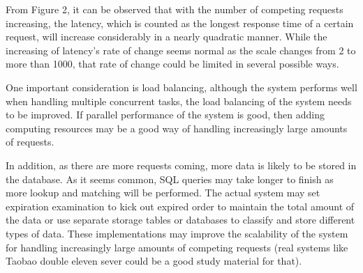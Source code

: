 \documentclass{article}
\begin{document}
From Figure 2, it can be observed that with the number of competing requests increasing, the latency, which is counted as the longest response time of a certain request, will increase considerably in a nearly quadratic manner. While the increasing of latency’s rate of change seems normal as the scale changes from 2 to more than 1000, that rate of change could be limited in several possible ways.\vspace{\baselineskip}

One important consideration is load balancing, although the system performs well when handling multiple concurrent tasks, the load balancing of the system needs to be improved. If parallel performance of the system is good, then adding computing resources may be a good way of handling increasingly large amounts of requests.\vspace{\baselineskip}

In addition, as there are more requests coming, more data is likely to be stored in the database. As it seems common, SQL queries may take longer to finish as more lookup and matching will be performed. The actual system may set expiration examination to kick out expired order to maintain the total amount of the data or use separate storage tables or databases to classify and store different types of data. These implementations may improve the scalability of the system for handling increasingly large amounts of competing requests (real systems like Taobao double eleven sever could be a good study material for that).
\end{document}
